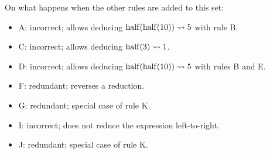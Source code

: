 \begin{exercise}{}
\begin{solution}
    On what happens when the other rules are added to this set:
    \begin{itemize}
      \item A: incorrect; allows deducing \(\operatorname{half}(\operatorname{half}(10)) \leadsto 5\) with
      rule B.
      \item C: incorrect; allows deducing \(\operatorname{half}(3) \leadsto 1\).
      \item D: incorrect; allows deducing \(\operatorname{half}(\operatorname{half}(10)) \leadsto 5\) with
      rules B and E.
      \item F: redundant; reverses a reduction.
      \item G: redundant; special case of rule K.
      \item I: incorrect; does not reduce the expression left-to-right.
      \item J: redundant; special case of rule K.
    \end{itemize}
  \end{solution}

\end{exercise}

